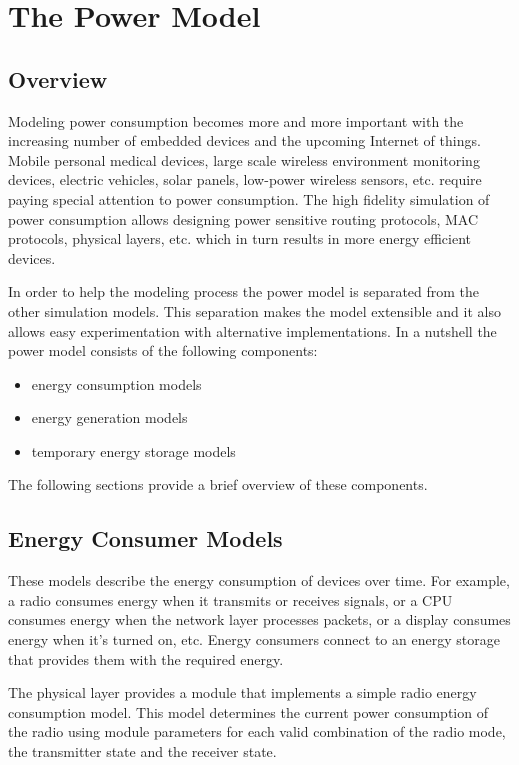 \chapter{The Power Model}
\label{cha:power}

\section{Overview}

Modeling power consumption becomes more and more important with the increasing
number of embedded devices and the upcoming Internet of things. Mobile personal
medical devices, large scale wireless environment monitoring devices, electric
vehicles, solar panels, low-power wireless sensors, etc. require paying special
attention to power consumption. The high fidelity simulation of power
consumption allows designing power sensitive routing protocols, MAC protocols,
physical layers, etc. which in turn results in more energy efficient devices.

In order to help the modeling process the power model is separated from the
other simulation models. This separation makes the model extensible and it also
allows easy experimentation with alternative implementations. In a nutshell the
power model consists of the following components:

\begin{itemize}
  \item energy consumption models
  \item energy generation models
  \item temporary energy storage models
\end{itemize}

The following sections provide a brief overview of these components. 

\section{Energy Consumer Models}

These models describe the energy consumption of devices over time. For example,
a radio consumes energy when it transmits or receives signals, or a CPU consumes
energy when the network layer processes packets, or a display consumes energy
when it's turned on, etc. Energy consumers connect to an energy storage that
provides them with the required energy.

The physical layer provides a  module that 
implements a simple radio energy consumption model. This model determines the
current power consumption of the radio using module parameters for each valid
combination of the radio mode, the transmitter state and the receiver state.

